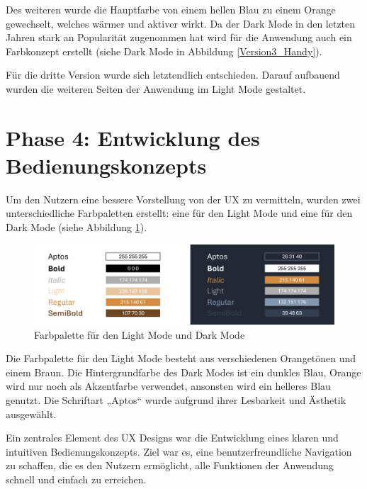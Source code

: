 Des weiteren wurde die Hauptfarbe von einem hellen Blau zu einem Orange gewechselt, welches wärmer und aktiver wirkt. Da der Dark Mode in den letzten Jahren stark an Popularität zugenommen hat \cite{diva2020darkmode} wird für die Anwendung auch ein Farbkonzept erstellt (siehe Dark Mode in Abbildung \ref{Version3_Handy}). 

Für die dritte Version wurde sich letztendlich entschieden. Darauf aufbauend wurden die weiteren Seiten der Anwendung im Light Mode gestaltet.

\section{Phase 4: Entwicklung des Bedienungskonzepts}
\label{sec:bedienungskonzept}
Um den Nutzern eine bessere Vorstellung von der UX zu vermitteln, wurden zwei unterschiedliche Farbpaletten erstellt: eine für den Light Mode und eine für den Dark Mode (siehe Abbildung \ref{Farbpalette}).

\begin{figure}[h]
    \centering
    \includegraphics[clip,width=0.9\linewidth]{images/Farbpalette.png}
    \caption[Farbpalette für den Light Mode und Dark Mode]{Farbpalette für den Light Mode und Dark Mode}
    \label{Farbpalette}
\end{figure}

Die Farbpalette für den Light Mode besteht aus verschiedenen Orangetönen und einem Braun. Die Hintergrundfarbe des Dark Modes ist ein dunkles Blau, Orange wird nur noch als Akzentfarbe verwendet, ansonsten wird ein helleres Blau genutzt.
Die Schriftart „Aptos“ wurde aufgrund ihrer Lesbarkeit und Ästhetik ausgewählt.

Ein zentrales Element des UX Designs war die Entwicklung eines klaren und intuitiven Bedienungskonzepts. Ziel war es, eine benutzerfreundliche Navigation zu schaffen, die es den Nutzern ermöglicht, alle Funktionen der Anwendung schnell und einfach zu erreichen.

